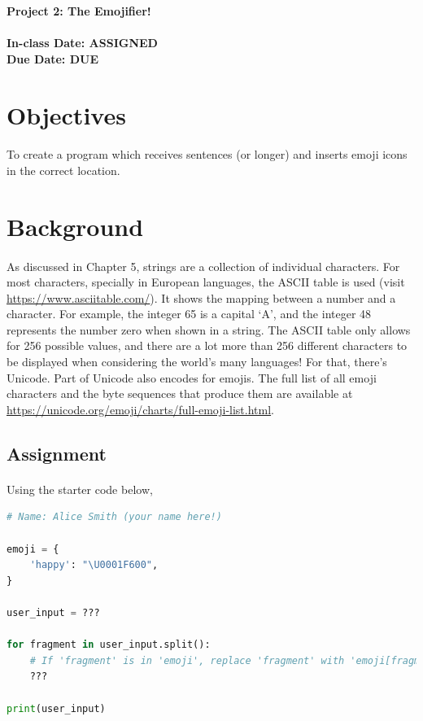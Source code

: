 \documentclass[letter,10pt]{article}
\begin{document}
    
    \huge
    \textbf{Project 2: The Emojifier!}
    \normalsize
    \\ ~~ \\
    \textbf{In-class Date: ASSIGNED} \\
    \textbf{Due Date: DUE}
    
    \section*{Objectives}
    \paragraph{}To create a program which receives sentences (or longer) and inserts emoji icons in the correct location.
    
    \section*{Background}
    \paragraph{}As discussed in Chapter 5, strings are a collection of individual characters. For most characters, specially in European languages, the ASCII table is used (visit \url{https://www.asciitable.com/}). It shows the mapping between a number and a character. For example, the integer 65 is a capital `A', and the integer 48 represents the number zero when shown in a string. The ASCII table only allows for 256 possible values, and there are a lot more than 256 different characters to be displayed when considering the world's many languages! For that, there's Unicode. Part of Unicode also encodes for emojis. The full list of all emoji characters and the byte sequences that produce them are available at \url{https://unicode.org/emoji/charts/full-emoji-list.html}.
    
    \subsection*{Assignment}
    \paragraph{}Using the starter code below, 
    
    \begin{lstlisting}[language=python]
# Name: Alice Smith (your name here!)

emoji = {
    'happy': "\U0001F600",
}

user_input = ???

for fragment in user_input.split():
    # If 'fragment' is in 'emoji', replace 'fragment' with 'emoji[fragment]'
    ???

print(user_input)
    \end{lstlisting}
\end{document}
